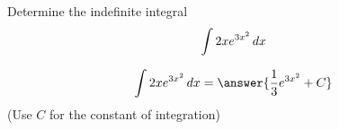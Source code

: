 \documentclass{ximera}
\author{Jason Miller}
\begin{document}
\begin{exercise}
Determine the indefinite integral
\[
\int 2xe^{3x^{2}} \mathop{}\!d  x 
\]



\[
\int 2xe^{3x^{2}} \d x=\answer{\frac{1}{3}e^{3x^{2}}+C}
\]
(Use $C$ for the constant of integration)

\end{exercise}
\end{document}
